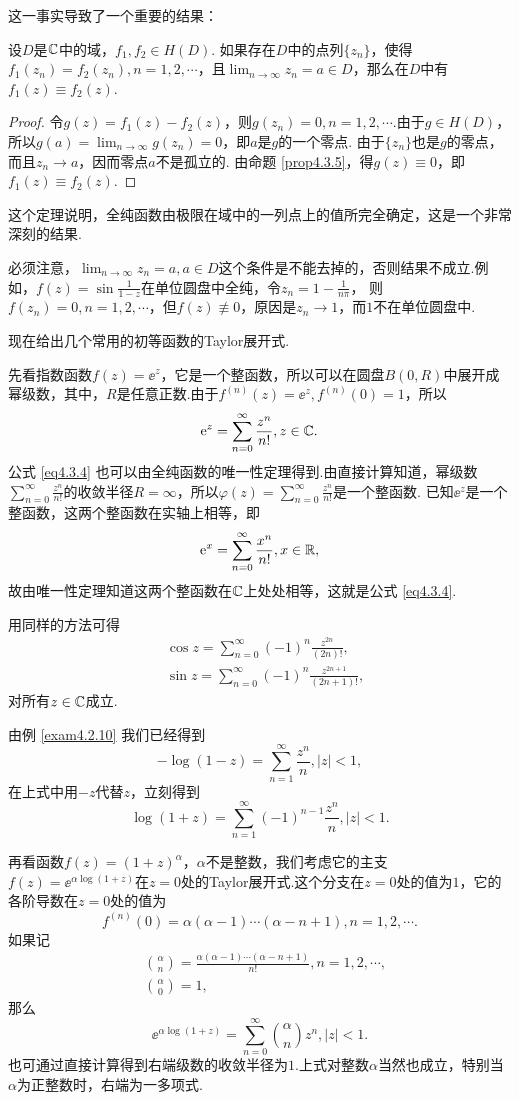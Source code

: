 这一事实导致了一个重要的结果：
\begin{theorem}\label{thm4.3.7}
  设$D$是$\mathbb C$中的域，$f_1,f_2\in H(D)$. 如果存在$D$中的点列$\{z_n\}$，使得$f_1(z_n)=f_2(z_n),n=1,2,\cdots$，且$\lim_{n\to\infty}z_n=a\in D$，那么在$D$中有$f_1(z)\equiv f_2(z)$.
\end{theorem}
\begin{proof}
  令$g(z)=f_1(z)-f_2(z)$，则$g(z_n)=0,n=1,2,\cdots$.由于$g\in H(D)$，所以$g(a)=\lim_{n\to\infty}g(z_n)=0$，即$a$是$g$的一个零点. 由于$\{z_n\}$也是$g$的零点，而且$z_n\to a$，因而零点$a$不是孤立的. 由命题 \ref{prop4.3.5}，得$g(z)\equiv 0$，即$f_1(z)\equiv f_2(z)$.
\end{proof}

这个定理说明，全纯函数由极限在域中的一列点上的值所完全确定，这是一个非常深刻的结果.

必须注意，$\lim_{n\to\infty}z_n=a,a\in D$这个条件是不能去掉的，否则结果不成立.例如，$f(z)=\sin\frac1{1-z}$在单位圆盘中全纯，令$z_n=1-\frac1{n\pi}$，
则$f(z_n)=0,n=1,2,\cdots$，但$f(z)\not\equiv0$，原因是$z_n\to1$，而$1$不在单位圆盘中.

现在给出几个常用的初等函数的Taylor展开式.

先看指数函数$f(z)=\ee^z$，它是一个整函数，所以可以在圆盘$B(0,R)$中展开成幂级数，其中，$R$是任意正数.由于$f^{(n)}(z)=\ee^z,f^{(n)}(0)=1$，所以
\begin{equation}\label{eq4.3.4}
  \operatorname{\!\!\;\mathrm e}^z=\sum_{n=0}^\infty\frac{z^n}{n!},z\in \mathbb C.
\end{equation}
公式 \eqref{eq4.3.4} 也可以由全纯函数的唯一性定理得到.由直接计算知道，幂级数$\sum_{n=0}^\infty\frac{z^n}{n!}$的收敛半径$R=\infty$，所以$\varphi(z)=\sum_ {n=0}^\infty\frac{z^n}{n!}$是一个整函数. 已知$\ee^z$是一个整函数，这两个整函数在实轴上相等，即
\[\operatorname{\!\!\;\mathrm e}^x=\sum_{n=0}^\infty \frac{x^n}{n!},x\in \mathbb R,\]
故由唯一性定理知道这两个整函数在$\mathbb C$上处处相等，这就是公式 \eqref{eq4.3.4}.

用同样的方法可得
\begin{align*}
  & \cos z = \sum_{n=0}^\infty(-1)^n\frac{z^{2n}}{(2n)!},\\
  & \sin z = \sum_{n=0}^\infty(-1)^n\frac{z^{2n+1}}{(2n+1)!},
\end{align*}
对所有$z\in \mathbb C$成立.

由例 \ref{exam4.2.10} 我们已经得到
\[
  -\log(1-z) = \sum_{n=1}^\infty \frac{z^n}n,|z|<1,
\]
在上式中用$-z$代替$z$，立刻得到
\[
  \log(1+z) = \sum_{n=1}^\infty(-1)^{n-1}\frac{z^n}n,|z|<1.
\]

再看函数$f(z)=(1+z)^\alpha$，$\alpha$不是整数，我们考虑它的主支$f(z)=\ee^{\alpha\log(1+z)}$在$z=0$处的Taylor展开式.这个分支在$z=0$处的值为$1$，它的各阶导数在$z=0$处的值为
\[
  f^{(n)}(0) = \alpha(\alpha-1)\cdots(\alpha-n+1),n=1,2,\cdots.
\]
如果记
\begin{align*}
  &\binom\alpha n=\frac{\alpha(\alpha-1)\cdots(\alpha-n+1)}{n!},n=1,2,\cdots,\\
  &\binom\alpha0=1,
\end{align*}
那么
\[
  \ee^{\alpha\log(1+z)} = \sum_{n=0}^\infty\binom\alpha nz^n,|z|<1.
\]
也可通过直接计算得到右端级数的收敛半径为$1$.上式对整数$\alpha$当然也成立，特别当$\alpha$为正整数时，右端为一多项式.

